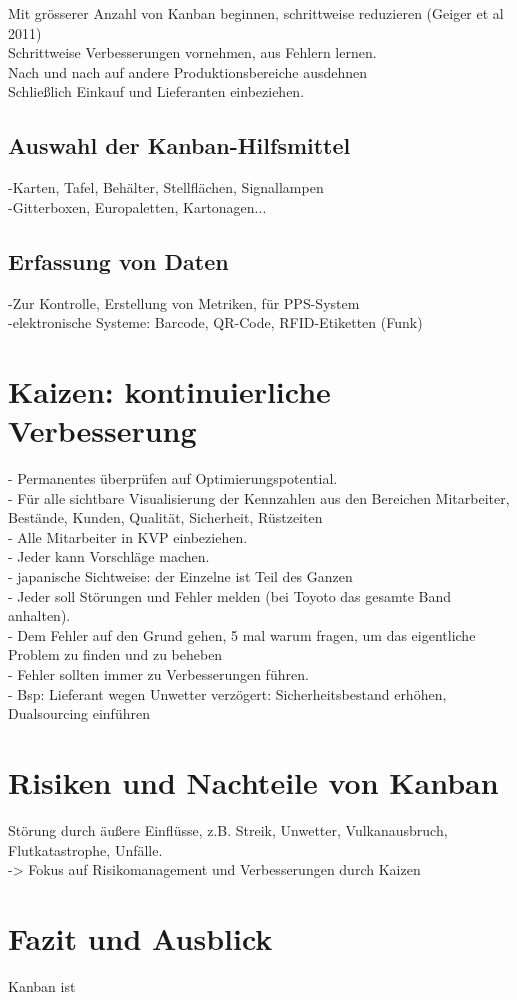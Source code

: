 Mit grösserer Anzahl von Kanban beginnen, schrittweise reduzieren (Geiger et al 2011)\\
Schrittweise Verbesserungen vornehmen, aus Fehlern lernen.\\
Nach und nach auf andere Produktionsbereiche ausdehnen\\
Schließlich Einkauf und Lieferanten einbeziehen.\\

\subsection{Auswahl der Kanban-Hilfsmittel}
-Karten, Tafel, Behälter, Stellflächen, Signallampen\\
-Gitterboxen, Europaletten, Kartonagen...\\

\subsection{Erfassung von Daten}
-Zur Kontrolle, Erstellung von Metriken, für PPS-System\\
-elektronische Systeme: Barcode, QR-Code, RFID-Etiketten (Funk)\\

\section{Kaizen: kontinuierliche Verbesserung}
- Permanentes überprüfen auf Optimierungspotential.\\
- Für alle sichtbare Visualisierung der Kennzahlen aus den Bereichen Mitarbeiter, Bestände, Kunden, Qualität, Sicherheit, Rüstzeiten\\
- Alle Mitarbeiter in KVP einbeziehen.\\
- Jeder kann Vorschläge machen.\\
- japanische Sichtweise: der Einzelne ist Teil des Ganzen\\
- Jeder soll Störungen und Fehler melden (bei Toyoto das gesamte Band anhalten).\\
- Dem Fehler auf den Grund gehen, 5 mal warum fragen, um das eigentliche Problem zu finden und zu beheben\\
- Fehler sollten immer zu Verbesserungen führen.\\
- Bsp: Lieferant wegen Unwetter verzögert: Sicherheitsbestand erhöhen, Dualsourcing einführen\\

\section{Risiken und Nachteile von Kanban}
Störung durch äußere Einflüsse, z.B. Streik, Unwetter, Vulkanausbruch, Flutkatastrophe, Unfälle.\\
-> Fokus auf Risikomanagement und Verbesserungen durch Kaizen\\

\section{Fazit und Ausblick}
Kanban ist 
